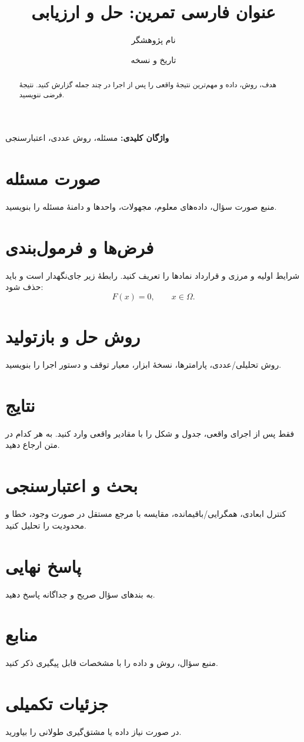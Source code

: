 \documentclass[12pt,a4paper]{article}
\title{عنوان فارسی تمرین: حل و ارزیابی}
\author{نام پژوهشگر}
\date{تاریخ و نسخه}
\begin{document}
\maketitle
\begin{abstract}
هدف، روش، داده و مهم‌ترین نتیجهٔ واقعی را پس از اجرا در چند جمله گزارش کنید. نتیجهٔ فرضی ننویسید.
\end{abstract}
\noindent\textbf{واژگان کلیدی:} مسئله، روش عددی، اعتبارسنجی

\section{صورت مسئله}
منبع صورت سؤال، داده‌های معلوم، مجهولات، واحدها و دامنهٔ مسئله را بنویسید.
\section{فرض‌ها و فرمول‌بندی}
شرایط اولیه و مرزی و قرارداد نمادها را تعریف کنید. رابطهٔ زیر جای‌نگهدار است و باید حذف شود:
\begin{equation}
F(x)=0, \qquad x\in\Omega .
\label{eq:placeholder}
\end{equation}
\section{روش حل و بازتولید}
روش تحلیلی/عددی، پارامترها، نسخهٔ ابزار، معیار توقف و دستور اجرا را بنویسید.
\section{نتایج}
فقط پس از اجرای واقعی، جدول و شکل را با مقادیر واقعی وارد کنید. به هر کدام در متن ارجاع دهید.
\section{بحث و اعتبارسنجی}
کنترل ابعادی، همگرایی/باقیمانده، مقایسه با مرجع مستقل در صورت وجود، خطا و محدودیت را تحلیل کنید.
\section{پاسخ نهایی}
به بندهای سؤال صریح و جداگانه پاسخ دهید.
\section{منابع}
منبع سؤال، روش و داده را با مشخصات قابل پیگیری ذکر کنید.
\appendix
\section{جزئیات تکمیلی}
در صورت نیاز داده یا مشتق‌گیری طولانی را بیاورید.
\end{document}
